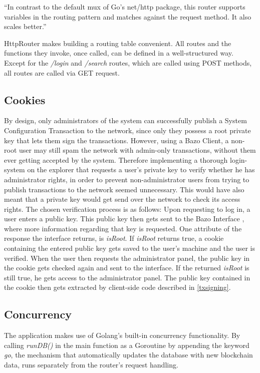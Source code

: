 ``In contrast to the default mux of Go's net/http package, this router supports variables in the routing pattern and matches against the request method. It also scales better.'' \cite{httprouter}

HttpRouter makes building a routing table convenient. All routes and the functions they invoke, once called, can be defined in a well-structured way. Except for the \emph{/login} and \emph{/search} routes, which are called using POST methods, all routes are called via GET request.


\subsection{Cookies} \label{cookies}

By design, only administrators of the system can successfully publish a System Configuration Transaction to the network, since only they possess a root private key that lets them sign the transactions. However, using a Bazo Client, a non-root user may still spam the network with admin-only transactions, without them ever getting accepted by the system. Therefore implementing a thorough login-system on the explorer that requests a user's private key to verify whether he has administrator rights, in order to prevent non-administrator users from trying to publish transactions to the network seemed unnecessary. This would have also meant that a private key would get send over the network to check its access rights. The chosen verification process is as follows:
Upon requesting to log in, a user enters a public key. This public key then gets sent to the Bazo Interface \cite{marc}, where more information regarding that key is requested. One attribute of the response the interface returns, is \emph{isRoot}. If \emph{isRoot} returns true, a cookie containing the entered public key gets saved to the user's machine and the user is verified. When the user then requests the administrator panel, the public key in the cookie gets checked again and sent to the interface. If the returned \emph{isRoot} is still true, he gets access to the administrator panel. The public key contained in the cookie then gets extracted by client-side code described in \ref{txsigning}. 

\subsection{Concurrency}
The application makes use of Golang's built-in concurrency functionality. By calling \emph{runDB()} in the main function as a Goroutine by appending the keyword \emph{go}, the mechanism that automatically updates the database with new blockchain data, runs separately from the router's request handling.

